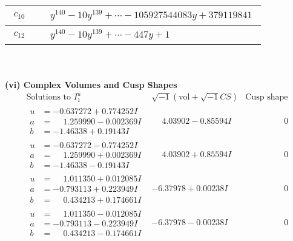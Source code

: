 \documentclass[1p]{elsarticle_modified}
\theoremstyle{definition}
\newcommand{\I}{\sqrt{-1}}
\begin{document}
\begin{tabular}{m{50pt}|m{274pt}}
\hline $$\begin{aligned}c_{10}\end{aligned}$$&$\begin{aligned}
&y^{140}-10 y^{139}+\cdots-105927544083 y+379119841
\end{aligned}$\\
\hline $$\begin{aligned}c_{12}\end{aligned}$$&$\begin{aligned}
&y^{140}-10 y^{139}+\cdots-447 y+1
\end{aligned}$\\
\hline
\end{tabular}\\~\\
\newpage\flushleft \textbf{(vi) Complex Volumes and Cusp Shapes}
$$\begin{array}{c|c|c}  
\text{Solutions to }I^u_{1}& \I (\text{vol} + \sqrt{-1}CS) & \text{Cusp shape}\\
 \hline 
\begin{aligned}
u &= -0.637272 + 0.774252 I \\
a &= \phantom{-}1.259990 - 0.002369 I \\
b &= -1.46338 + 0.19143 I\end{aligned}
 & \phantom{-}4.03902 - 0.85594 I & \phantom{-0.000000 } 0 \\ \hline\begin{aligned}
u &= -0.637272 - 0.774252 I \\
a &= \phantom{-}1.259990 + 0.002369 I \\
b &= -1.46338 - 0.19143 I\end{aligned}
 & \phantom{-}4.03902 + 0.85594 I & \phantom{-0.000000 } 0 \\ \hline\begin{aligned}
u &= \phantom{-}1.011350 + 0.012085 I \\
a &= -0.793113 + 0.223949 I \\
b &= \phantom{-}0.434213 + 0.174661 I\end{aligned}
 & -6.37978 + 0.00238 I & \phantom{-0.000000 } 0 \\ \hline\begin{aligned}
u &= \phantom{-}1.011350 - 0.012085 I \\
a &= -0.793113 - 0.223949 I \\
b &= \phantom{-}0.434213 - 0.174661 I\end{aligned}
 & -6.37978 - 0.00238 I & \phantom{-0.000000 } 0 \\ \hline\begin{aligned}

\end{aligned}
\end{array}$$
\end{document}
